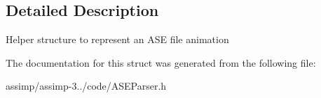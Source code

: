 \subsection{Detailed Description}
Helper structure to represent an A\+S\+E file animation 

The documentation for this struct was generated from the following file\+:\begin{DoxyCompactItemize}
\item 
assimp/assimp-\/3../code/A\+S\+E\+Parser.\+h\end{DoxyCompactItemize}
